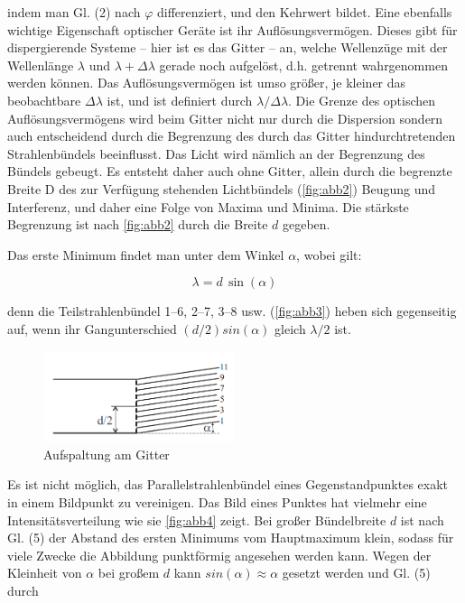\documentclass[11pt,ngerman]{scrartcl}
\begin{document}
indem man Gl. (2) nach $\varphi$ differenziert, und den Kehrwert bildet. Eine
ebenfalls wichtige Eigenschaft optischer Geräte ist ihr Auflösungsvermögen.
Dieses gibt für dispergierende Systeme – hier ist es das Gitter – an, welche
Wellenzüge mit der Wellenlänge $\lambda$ und $\lambda + \Delta \lambda$ gerade
noch aufgelöst, d.h. getrennt wahrgenommen werden können. Das
Auflösungsvermögen ist umso größer, je kleiner das beobachtbare $\Delta
	\lambda$ ist, und ist definiert durch $\lambda / \Delta \lambda$. Die Grenze
des optischen Auflösungsvermögens wird beim Gitter nicht nur durch die
Dispersion sondern auch entscheidend durch die Begrenzung des durch das Gitter
hindurchtretenden Strahlenbündels beeinflusst. Das Licht wird nämlich an der
Begrenzung des Bündels gebeugt. Es entsteht daher auch ohne Gitter, allein
durch die begrenzte Breite D des zur Verfügung stehenden Lichtbündels
(\autoref{fig:abb2}) Beugung und Interferenz, und daher eine Folge von Maxima
und Minima. Die stärkste Begrenzung ist nach \autoref{fig:abb2} durch die
Breite $d$ gegeben.

\vspace{2mm}

Das erste Minimum findet man unter dem Winkel $\alpha$, wobei gilt:

\begin{equation}
	\lambda = d \, \sin{ (\alpha)}
\end{equation}

denn die Teilstrahlenbündel 1–6, 2–7, 3–8
usw. (\autoref{fig:abb3}) heben sich gegenseitig auf,
wenn ihr Gangunterschied $(d/2) sin (\alpha)$ gleich
$\lambda/2$ ist.

\begin{figure}[H]
	\begin{center}
		\includegraphics[width=0.5\textwidth]{abb3}
	\end{center}
	\caption{Aufspaltung am Gitter}
	\label{fig:abb3}
\end{figure}

Es ist nicht möglich, das Parallelstrahlenbündel eines Gegenstandpunktes exakt in einem Bildpunkt
zu vereinigen. Das Bild eines Punktes hat vielmehr eine Intensitätsverteilung wie sie
\autoref{fig:abb4} zeigt.
Bei großer Bündelbreite $d$ ist nach Gl. (5) der Abstand des ersten Minimums vom Hauptmaximum
klein, sodass für viele Zwecke die Abbildung punktförmig angesehen werden kann. Wegen
der Kleinheit von $\alpha$ bei großem $d$ kann  $sin (\alpha) \approx \alpha$ gesetzt werden und Gl. (5) durch
\end{document}
